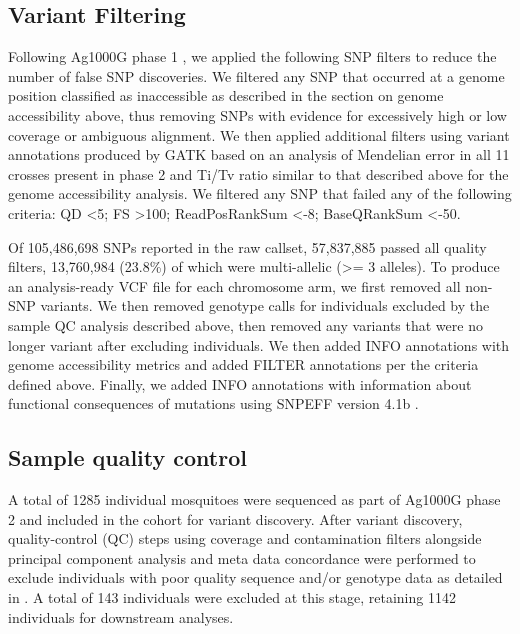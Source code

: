 \documentclass[a4paper,11pt,abstracton,hidelinks]{scrartcl}
\begin{document}
\subsection*{Variant Filtering}


Following Ag1000G phase 1 \cite{Ag1000G2017}, we applied the following SNP filters to reduce the number of false SNP discoveries.
%
We filtered any SNP that occurred at a genome position classified as inaccessible as described in the section on genome accessibility above, thus removing SNPs with evidence for excessively high or low coverage or ambiguous alignment. 
%
We then applied additional filters using variant annotations produced by GATK based on an analysis of Mendelian error in all 11 crosses present in phase 2 and Ti/Tv ratio similar to that described above for the genome accessibility analysis.
%
We filtered any SNP that failed any of the following criteria: QD <5; FS >100; ReadPosRankSum <-8; BaseQRankSum <-50. 


Of 105,486,698 SNPs reported in the raw callset, 57,837,885 passed all quality filters, 13,760,984 (23.8\%) of which were multi-allelic (>= 3 alleles).
%
To produce an analysis-ready VCF file for each chromosome arm, we first removed all non-SNP variants. 
%
We then removed genotype calls for individuals excluded by the sample QC analysis described above, then removed any variants that were no longer variant after excluding individuals. 
%
We then added INFO annotations with genome accessibility metrics and added FILTER annotations per the criteria defined above. 
%
Finally, we added INFO annotations with information about functional consequences of mutations using SNPEFF version 4.1b \cite{Cingolani2012}.


\subsection*{Sample quality control}
%
A total of 1285 individual mosquitoes were sequenced as part of Ag1000G phase 2 and included in the cohort for variant discovery. 
%
After variant discovery, quality-control (QC) steps using coverage and contamination filters alongside principal component analysis and meta data concordance were performed to exclude individuals with poor quality sequence and/or genotype data as detailed in \cite{Ag1000G2017}.
%
A total of 143 individuals were excluded at this stage, retaining 1142 individuals for downstream analyses.
\end{document}

